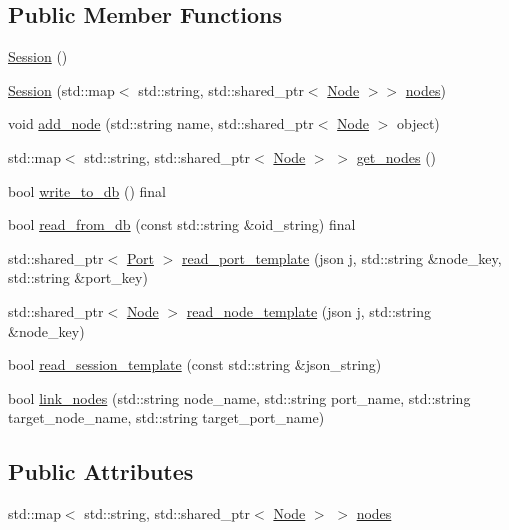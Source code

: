 \subsection*{Public Member Functions}
\begin{DoxyCompactItemize}
\item 
\hyperlink{class_session_ad92ef09b872c9227e38a6efdd4d8a837}{Session} ()
\item 
\hyperlink{class_session_a556c8971b03563ae3c94dc1d19cbed27}{Session} (std\+::map$<$ std\+::string, std\+::shared\+\_\+ptr$<$ \hyperlink{class_node}{Node} $>$$>$ \hyperlink{class_session_a0b50e79f5e66081dd5112571107bc652}{nodes})
\item 
void \hyperlink{class_session_a7b5d3b9db809cc54e515639b78b0e811}{add\+\_\+node} (std\+::string name, std\+::shared\+\_\+ptr$<$ \hyperlink{class_node}{Node} $>$ object)
\item 
std\+::map$<$ std\+::string, std\+::shared\+\_\+ptr$<$ \hyperlink{class_node}{Node} $>$ $>$ \hyperlink{class_session_af091cae3db4abcc5afe4a8abaef222f2}{get\+\_\+nodes} ()
\item 
bool \hyperlink{class_session_a513e5436b4c990985300246bb39d9f5c}{write\+\_\+to\+\_\+db} () final
\item 
bool \hyperlink{class_session_a4f09644fd155a1d5640cedefe4aa42fc}{read\+\_\+from\+\_\+db} (const std\+::string \&oid\+\_\+string) final
\item 
std\+::shared\+\_\+ptr$<$ \hyperlink{class_port}{Port} $>$ \hyperlink{class_session_a092e487a152de25de0a37ef16356da7c}{read\+\_\+port\+\_\+template} (json j, std\+::string \&node\+\_\+key, std\+::string \&port\+\_\+key)
\item 
std\+::shared\+\_\+ptr$<$ \hyperlink{class_node}{Node} $>$ \hyperlink{class_session_a8d085cbe91c4ab1632e4eed199120123}{read\+\_\+node\+\_\+template} (json j, std\+::string \&node\+\_\+key)
\item 
bool \hyperlink{class_session_adb03e68fc271cf09c0175cb908b4afff}{read\+\_\+session\+\_\+template} (const std\+::string \&json\+\_\+string)
\item 
bool \hyperlink{class_session_a5eec7c1012a9a058f06347dd3cb18de3}{link\+\_\+nodes} (std\+::string node\+\_\+name, std\+::string port\+\_\+name, std\+::string target\+\_\+node\+\_\+name, std\+::string target\+\_\+port\+\_\+name)
\end{DoxyCompactItemize}
\subsection*{Public Attributes}
\begin{DoxyCompactItemize}
\item 
std\+::map$<$ std\+::string, std\+::shared\+\_\+ptr$<$ \hyperlink{class_node}{Node} $>$ $>$ \hyperlink{class_session_a0b50e79f5e66081dd5112571107bc652}{nodes}
\end{DoxyCompactItemize}
